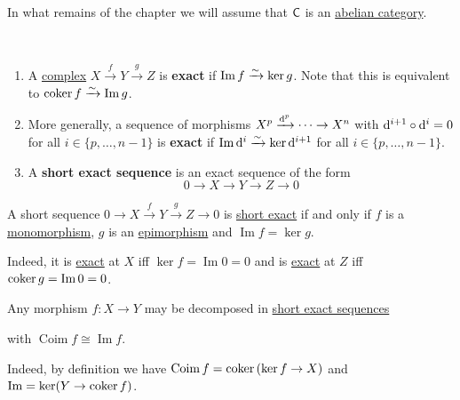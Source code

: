 \documentclass[../../main]{subfiles}
\begin{document}
In what remains of the chapter we will assume that \(\mathsf{C}\) is an \hyperref[def:abelian-category]{abelian category}.


\begin{definition}\label{def:exact-sequence}~
\begin{enumerate}
  \item A \hyperref[def:complex]{complex} \(X \xrightarrow{f} Y \xrightarrow{g} Z\) is \textbf{exact} if \(\operatorname{Im} f \xrightarrow{\sim} \ker g\).
        Note that this is equivalent to \(\operatorname*{coker} f \xrightarrow{\sim} \operatorname{Im} g\).
  \item More generally, a sequence of morphisms \(X^{p} \xrightarrow{\mathrm{d}^{p}} \cdots \to X^{n}\) with \(\mathrm{d}^{i+1} \circ \mathrm{d}^{i} = 0\) for all \(i \in \{p, \ldots, n-1\}\) is \textbf{exact} if \(\operatorname{Im} \mathrm{d}^{i} \xrightarrow{\sim} \ker \mathrm{d}^{i+1}\) for all \(i \in \{p, \ldots, n-1\}\).
  \item A \textbf{short exact sequence} is an exact sequence of the form
        \begin{equation*}
          0 \to X \to Y \to Z \to 0
        \end{equation*}
\end{enumerate}
\end{definition}

\begin{remark}
  A short sequence \(0 \to X \xrightarrow{f} Y \xrightarrow{g} Z \to 0\) is \hyperref[def:exact-sequence]{short exact} if and only if \(f\) is a \hyperref[def:mono-epi-morphism]{monomorphism}, \(g\) is an \hyperref[def:mono-epi-morphism]{epimorphism} and \(\operatorname{Im} f = \ker g\).

  Indeed, it is \hyperref[def:exact-sequence]{exact} at \(X\) iff \(\ker f = \operatorname{Im} 0 = 0\) and is \hyperref[def:exact-sequence]{exact} at \(Z\) iff \(\operatorname*{coker} g = \operatorname{Im} 0 = 0\).
\end{remark}

\begin{example}
  Any morphism \(f\colon X \to Y\) may be decomposed in \hyperref[def:exact-sequence]{short exact sequences}
  \begin{center}
  \end{center}
  with \(\operatorname{Coim} f \cong \operatorname{Im} f\).

  Indeed, by definition we have \(\operatorname{Coim} f = \operatorname*{coker} \left( \ker f \to X \right)\) and \(\operatorname{Im} = \ker (Y \to \operatorname*{coker} f)\).
\end{example}
\end{document}
